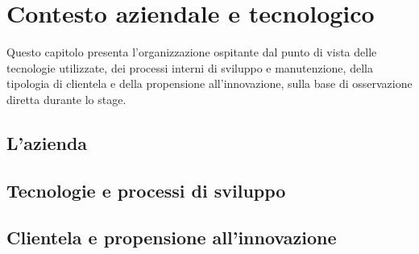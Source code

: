 \chapter{Contesto aziendale e tecnologico}
\label{chap:contesto-aziendale}

Questo capitolo presenta l'organizzazione ospitante dal punto di vista delle tecnologie utilizzate, dei processi interni di sviluppo e manutenzione, della tipologia di clientela e della propensione all'innovazione, sulla base di osservazione diretta durante lo stage.

\section{L'azienda}
\label{sec:azienda}




\section{Tecnologie e processi di sviluppo}
\label{sec:tecnologie-processi}




\section{Clientela e propensione all'innovazione}
\label{sec:clientela-innovazione}


